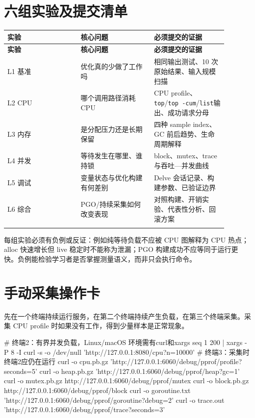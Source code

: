 \documentclass[UTF8,fontset=fandol,openany,11pt]{ctexbook}
\begin{document}
\section{六组实验及提交清单}
\begingroup\small\setlength{\tabcolsep}{4pt}
\begin{longtable}{>{\raggedright\arraybackslash}p{0.298\linewidth}>{\raggedright\arraybackslash}p{0.298\linewidth}>{\raggedright\arraybackslash}p{0.298\linewidth}}
\toprule
\textbf{实验} & \textbf{核心问题} & \textbf{必须提交的证据} \\
\midrule
\endfirsthead
\toprule
\textbf{实验} & \textbf{核心问题} & \textbf{必须提交的证据} \\
\midrule
\endhead
L1 基准 & 优化真的少做了工作吗 & 相同输出测试、10 次原始结果、输入规模扫描 \\
\addlinespace[3pt]
L2 CPU & 哪个调用路径消耗 CPU & CPU profile、\texttt{top}/\texttt{top -\allowbreak{}cum}/\texttt{list}输出、成功请求分母 \\
\addlinespace[3pt]
L3 内存 & 是分配压力还是长期保留 & 四种 sample index、GC 前后趋势、生命周期解释 \\
\addlinespace[3pt]
L4 并发 & 等待发生在哪里、谁持锁 & block、mutex、trace 与吞吐—并发曲线 \\
\addlinespace[3pt]
L5 调试 & 变量状态与优化构建有何差别 & Delve 会话记录、构建参数、已验证边界 \\
\addlinespace[3pt]
L6 综合 & PGO/持续采集如何改变表现 & 对照构建、开销实验、代表性分析、回滚方案 \\
\addlinespace[3pt]
\bottomrule
\end{longtable}
\endgroup
每组实验必须有负例或反证：例如纯等待负载不应被 CPU 图解释为 CPU 热点；alloc 快速增长但 live 稳定时不能称为泄漏；PGO 构建成功不应等同于运行更快。负例能检验学习者是否掌握测量语义，而非只会执行命令。

\section{手动采集操作卡}
先在一个终端持续运行服务，在第二个终端持续产生负载，在第三个终端采集。采集 CPU profile 时如果没有工作，得到少量样本是正常现象。

\begin{codeblock}
# 终端2：有界并发负载，Linux/macOS 环境需有curl和xargs
seq 1 200 | xargs -P 8 -I{} curl -s -o /dev/null   'http://127.0.0.1:8080/cpu?n=10000'
# 终端3：采集时终端2应仍在运行
curl -o cpu.pb.gz 'http://127.0.0.1:6060/debug/pprof/profile?seconds=5'
curl -o heap.pb.gz 'http://127.0.0.1:6060/debug/pprof/heap?gc=1'
curl -o mutex.pb.gz http://127.0.0.1:6060/debug/pprof/mutex
curl -o block.pb.gz http://127.0.0.1:6060/debug/pprof/block
curl -o goroutine.txt 'http://127.0.0.1:6060/debug/pprof/goroutine?debug=2'
curl -o trace.out 'http://127.0.0.1:6060/debug/pprof/trace?seconds=3'
\end{codeblock}
\end{document}

